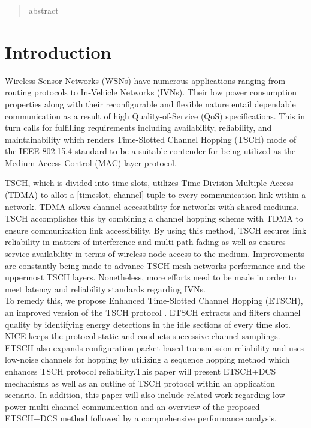 \documentclass[acmsmall, authorversion]{acmart}
\begin{document}
\maketitle

\begin{abstract}
abstract
\end{abstract}



\printccsdesc



 \section{Introduction}

   Wireless Sensor Networks (WSNs) have numerous applications ranging from routing protocols to In-Vehicle Networks (IVNs). Their low power consumption properties along with their reconfigurable and flexible nature entail dependable communication as a result of high Quality-of-Service (QoS) specifications. This in turn calls for fulfilling requirements including availability, reliability, and maintainability which renders Time-Slotted Channel Hopping (TSCH) mode of the IEEE 802.15.4 \cite{tavakoli2015enhanced} standard to be a suitable contender for being utilized as the Medium Access Control (MAC) layer protocol. 
   
   TSCH, which is divided into time slots, utilizes Time-Division Multiple Access (TDMA) to allot a [timeslot, channel] tuple to every communication link within a network. TDMA allows channel accessibility for networks with shared mediums. TSCH accomplishes this by combining a channel hopping scheme with TDMA to ensure communication link accessibility. By using this method, TSCH secures link reliability in matters of interference and multi-path fading as well as ensures service availability in terms of wireless node access to the medium. Improvements are constantly being made to advance TSCH mesh networks performance and the uppermost TSCH layers. Nonetheless, more efforts need to be made in order to meet latency and reliability standards regarding IVNs. 
  \\ \indent To remedy this, we propose Enhanced Time-Slotted Channel Hopping (ETSCH), an improved version of the TSCH protocol \cite{de}. ETSCH extracts and filters channel quality by identifying energy detections in the idle sections of every time slot. NICE keeps the protocol static and conducts successive channel samplings. ETSCH also expands configuration packet based transmission reliability and uses low-noise channels for hopping by utilizing a sequence hopping method which enhances TSCH protocol reliability.This paper will present ETSCH+DCS mechanisms as well as an outline of TSCH protocol within an application scenario.  In addition, this paper will also include related work regarding low-power multi-channel communication and an overview of the proposed ETSCH+DCS method followed by a comprehensive performance analysis.
\end{document}
